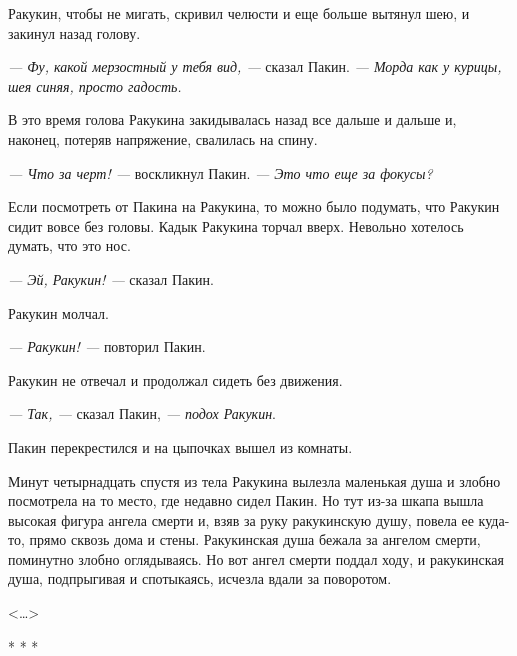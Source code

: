 Ракукин, чтобы не мигать, скривил челюсти и еще больше вытянул шею, и закинул назад голову.

\textit{--- Фу, какой мерзостный у тебя вид, ---} сказал Пакин. \textit{--- Морда как у курицы, шея синяя, просто гадость.}

В это время голова Ракукина закидывалась назад все дальше и дальше и, наконец, потеряв напряжение, свалилась на спину.

\textit{--- Что за черт! ---} воскликнул Пакин. \textit{--- Это что еще за фокусы?}

Если посмотреть от Пакина на Ракукина, то можно было подумать, что Ракукин сидит вовсе без головы. Кадык Ракукина торчал вверх. Невольно хотелось думать, что это нос.

\textit{--- Эй, Ракукин! ---} сказал Пакин.

Ракукин молчал.

\textit{--- Ракукин! ---} повторил Пакин.

Ракукин не отвечал и продолжал сидеть без движения.

\textit{--- Так, ---} сказал Пакин, \textit{--- подох Ракукин}.

Пакин перекрестился и на цыпочках вышел из комнаты.

Минут четырнадцать спустя из тела Ракукина вылезла маленькая душа и злобно посмотрела на то место, где недавно сидел Пакин. Но тут из-за шкапа вышла высокая фигура ангела смерти и, взяв за руку ракукинскую душу, повела ее куда-то, прямо сквозь дома и стены. Ракукинская душа бежала за ангелом смерти, поминутно злобно оглядываясь. Но вот ангел смерти поддал ходу, и ракукинская душа, подпрыгивая и спотыкаясь, исчезла вдали за поворотом.
\begin{flushright} <\dots> \end{flushright} 
\begin{center} * * * \end{center}